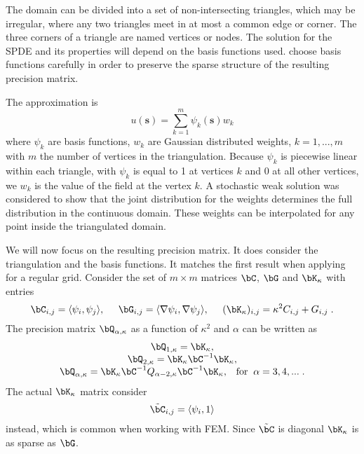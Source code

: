 The domain can be divided into a set of 
non-intersecting triangles, which may be 
irregular, where any two triangles meet 
in at most a common edge or corner. 
The three corners of a triangle are named 
vertices or nodes. 
The solution for the SPDE and its properties 
will depend on the basis functions used. 
\cite{lindgrenRL:2011} choose basis functions 
carefully in order to preserve the sparse structure 
of the resulting precision matrix. 

The approximation is 
\[u(\mathbf{s}) = \sum_{k=1}^{m}\psi_k(\mathbf{s})w_k\]
where $\psi_k$ are basis functions, 
$w_k$ are Gaussian distributed weights, 
$k=1,...,m$ with $m$ the number of vertices in the triangulation.
Because $\psi_k$ is piecewise linear within each triangle, 
with $\psi_k$ is equal to 1 at vertices $k$ 
and 0 at all other vertices, 
we $w_k$ is the value of the field at the vertex $k$. 
A stochastic weak solution was considered to show that 
the joint distribution for the weights determines 
the full distribution in the continuous domain. 
These weights can be interpolated for 
any point inside the triangulated domain. 

We will now focus on the resulting precision matrix. 
It does consider the triangulation and the basis functions. 
It matches the first result when applying for a regular grid. 
Consider the set of $m\times m$ matrices 
$\bC$, $\bG$ and $\bK_{\kappa}$ with entries 
\begin{equation}
\bC_{i,j} = \langle \psi_i, \psi_j\rangle, \;\;\;\;\;
\bG_{i,j} = \langle \nabla \psi_i, \nabla \psi_j \rangle, \;\;\;\;\;
(\bK_{\kappa})_{i,j} = \kappa^2 C_{i,j} + G_{i,j}\;.
\end{equation}
The precision matrix $\bQ_{\alpha,\kappa}$ 
as a function of $\kappa^2$ and $\alpha$ can be written as 
\begin{equation}\label{eq:Qalpha}\begin{array}{c}
\bQ_{1,\kappa} = \bK_{\kappa}, \\
\bQ_{2,\kappa} = \bK_{\kappa}\bC^{-1}\bK_{\kappa}, \\
\bQ_{\alpha,\kappa} = \bK_{\kappa}\bC^{-1}Q_{\alpha-2,\kappa}\bC^{-1}\bK_{\kappa}, 
\;\;\;\mbox{for} \;\;\alpha = 3,4,...\;.
\end{array}\end{equation}
The actual $\bK_{\kappa}$ matrix consider 
\[\tilde{\bC}_{i,j} = \langle \psi_i, 1 \rangle\]
instead, which is common when working with FEM.
Since $\tilde{\bC}$ is diagonal  
$\bK_{\kappa}$ is as sparse as $\bG$. 

